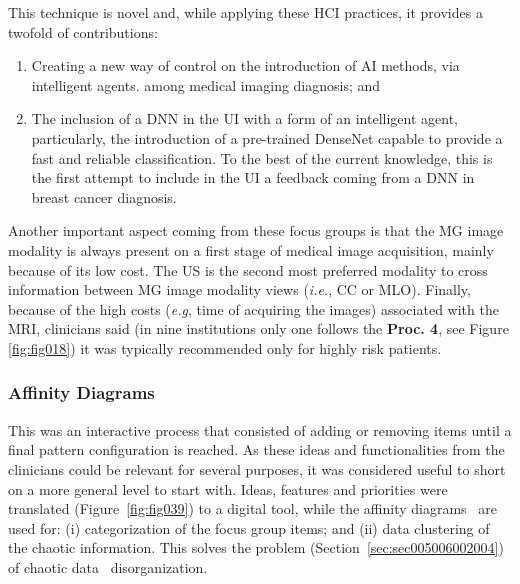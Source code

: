 \hfill

\noindent
This technique is novel and, while applying these \ac{HCI} practices, it provides a twofold of contributions:

\begin{enumerate}
\item Creating a new way of control on the introduction of \ac{AI} methods, via intelligent agents. among medical imaging diagnosis; and
\item The inclusion of a \ac{DNN} in the \ac{UI} with a form of an intelligent agent, particularly, the introduction of a pre-trained DenseNet capable to provide a fast and reliable classification. To the best of the current knowledge, this is the first attempt to include in the \ac{UI} a feedback coming from a \ac{DNN} in breast cancer diagnosis.
\end{enumerate}

Another important aspect coming from these focus groups is that the \ac{MG} image modality is always present on a first stage of medical image acquisition, mainly because of its low cost.
The \ac{US} is the second most preferred modality to cross information between \ac{MG} image modality views ({\it i.e.}, \ac{CC} or \ac{MLO}).
Finally, because of the high costs ({\it e.g}, time of acquiring the images) associated with the \ac{MRI}, clinicians said (in nine institutions only one follows the {\bf Proc. 4}, see Figure \ref{fig:fig018}) it was typically recommended only for highly risk patients.

\subsubsection{Affinity Diagrams}
\label{sec:sec005006002003}

This was an interactive process that consisted of adding or removing items until a final pattern configuration is reached.
As these ideas and functionalities from the clinicians could be relevant for several purposes, it was considered useful to short on a more general level to start with.
Ideas, features and priorities were translated (Figure~\ref{fig:fig039}) to a digital tool\footnotemark[31], while the affinity diagrams~\cite{10.1145/3290605.3300628} are used for: (i) categorization of the focus group items; and (ii) data clustering of the chaotic information.
This solves the problem (Section~\ref{sec:sec005006002004}) of chaotic data~\cite{10.1145/2858036.2858373, 10.1145/3343413.3377983} disorganization.

